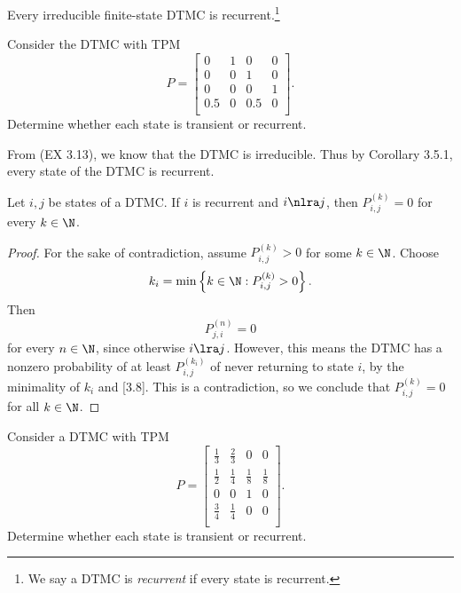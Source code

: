 \documentclass[stat333]{subfiles}
\begin{document}
    \begin{cor}{}
        Every irreducible finite-state DTMC is recurrent.\footnote{We say a DTMC is \emph{recurrent} if every state is recurrent.}
    \end{cor}	

    \ex Consider the DTMC with TPM
    \begin{equation*}
        P = 
        \begin{bmatrix}
        	0 & 1 & 0 & 0 \\
        	0 & 0 & 1 & 0 \\
        	0 & 0 & 0 & 1 \\
        	0.5 & 0 & 0.5 & 0 \\
        \end{bmatrix}.
    \end{equation*}
    Determine whether each state is transient or recurrent.

    \begin{subproof}[Answer]
        From (EX 3.13), we know that the DTMC is irreducible. Thus by Corollary 3.5.1, every state of the DTMC is recurrent.
    \end{subproof}

    \begin{prop}{}
        Let $i,j$ be states of a DTMC. If $i$ is recurrent and $i\nlra j$, then $P^{\left( k \right)}_{i,j}=0$ for every $k\in\N$.
    \end{prop}

    \begin{proof}
        For the sake of contradiction, assume $P^{\left( k \right)}_{i,j}>0$ for some $k\in\N$. Choose
        \begin{equation*}
            k_i = \min\left\lbrace k\in\N: P^{\left( k \right)}_{i,j}>0 \right\rbrace.
        \end{equation*}
        Then
        \begin{equation}
            P^{\left( n \right)}_{j,i} = 0
        \end{equation}
        for every $n\in\N$, since otherwise $i\lra j$. However, this means the DTMC has a nonzero probability of at least $P^{\left( k_i \right)}_{i,j}$ of never returning to state $i$, by the minimality of $k_i$ and [3.8]. This is a contradiction, so we conclude that $P^{\left( k \right)}_{i,j}=0$ for all $k\in\N$.
    \end{proof}

    \ex Consider a DTMC with TPM
    \begin{equation*}
        P = 
        \begin{bmatrix}
        	\frac{1}{3} & \frac{2}{3} & 0 & 0 \\
        	\frac{1}{2} & \frac{1}{4} & \frac{1}{8} & \frac{1}{8} \\
        	0 & 0 & 1 & 0 \\
        	\frac{3}{4} & \frac{1}{4} & 0 & 0 \\
        \end{bmatrix}.
    \end{equation*}
    Determine whether each state is transient or recurrent.
\end{document}
